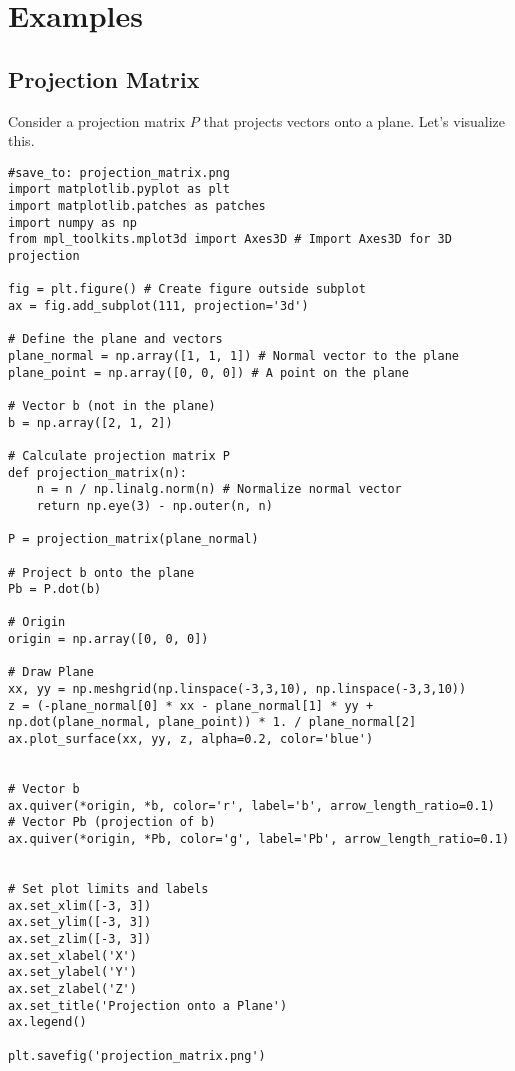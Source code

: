 \documentclass{article}
\begin{document}
\section{Examples}

\subsection{Projection Matrix}

Consider a projection matrix $P$ that projects vectors onto a plane. Let's visualize this.

\begin{verbatim}
#save_to: projection_matrix.png
import matplotlib.pyplot as plt
import matplotlib.patches as patches
import numpy as np
from mpl_toolkits.mplot3d import Axes3D # Import Axes3D for 3D projection

fig = plt.figure() # Create figure outside subplot
ax = fig.add_subplot(111, projection='3d')

# Define the plane and vectors
plane_normal = np.array([1, 1, 1]) # Normal vector to the plane
plane_point = np.array([0, 0, 0]) # A point on the plane

# Vector b (not in the plane)
b = np.array([2, 1, 2])

# Calculate projection matrix P
def projection_matrix(n):
    n = n / np.linalg.norm(n) # Normalize normal vector
    return np.eye(3) - np.outer(n, n)

P = projection_matrix(plane_normal)

# Project b onto the plane
Pb = P.dot(b)

# Origin
origin = np.array([0, 0, 0])

# Draw Plane
xx, yy = np.meshgrid(np.linspace(-3,3,10), np.linspace(-3,3,10))
z = (-plane_normal[0] * xx - plane_normal[1] * yy + np.dot(plane_normal, plane_point)) * 1. / plane_normal[2]
ax.plot_surface(xx, yy, z, alpha=0.2, color='blue')


# Vector b
ax.quiver(*origin, *b, color='r', label='b', arrow_length_ratio=0.1)
# Vector Pb (projection of b)
ax.quiver(*origin, *Pb, color='g', label='Pb', arrow_length_ratio=0.1)


# Set plot limits and labels
ax.set_xlim([-3, 3])
ax.set_ylim([-3, 3])
ax.set_zlim([-3, 3])
ax.set_xlabel('X')
ax.set_ylabel('Y')
ax.set_zlabel('Z')
ax.set_title('Projection onto a Plane')
ax.legend()

plt.savefig('projection_matrix.png')
\end{verbatim}
\end{document}
